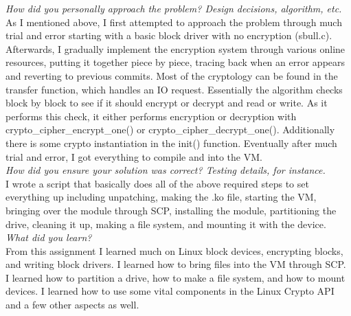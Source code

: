 \documentclass[letterpaper,10pt,titlepage]{article}
\begin{document}
\textit{How did you personally approach the problem? Design decisions, algorithm, etc.}\\

As I mentioned above, I first attempted to approach the problem through much trial and error starting with a basic block driver with no encryption (sbull.c).  Afterwards, I gradually implement the encryption system through various online resources, putting it together piece by piece, tracing back when an error appears and reverting to previous commits.  Most of the cryptology can be found in the transfer function, which handles an IO request.  Essentially the algorithm checks block by block to see if it should encrypt or decrypt and read or write.  As it performs this check, it either performs encryption or decryption with crypto_cipher_encrypt_one() or crypto_cipher_decrypt_one().  Additionally there is some crypto instantiation in the init() function.  Eventually after much trial and error, I got everything to compile and into the VM.\\

\textit{How did you ensure your solution was correct? Testing details, for instance.}\\

I wrote a script that basically does all of the above required steps to set everything up including unpatching, making the .ko file, starting the VM, bringing over the module through SCP, installing the module, partitioning the drive, cleaning it up, making a file system, and mounting it with the device.\\

\textit{What did you learn?}\\

From this assignment I learned much on Linux block devices, encrypting blocks, and writing block drivers.  I learned how to bring files into the VM through SCP.  I learned how to partition a drive, how to make a file system, and how to mount devices.  I learned how to use some vital components in the Linux Crypto API and a few other aspects as well.\\
\end{document}
